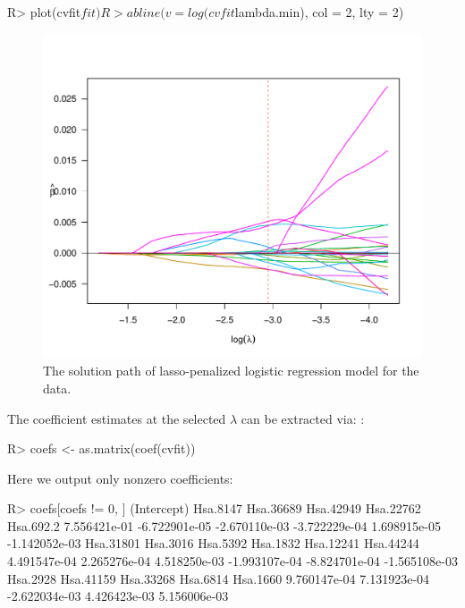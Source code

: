 \begin{example}
R> plot(cvfit$fit)
R> abline(v = log(cvfit$lambda.min), col = 2, lty = 2)
\end{example}

\begin{figure}[ht]
\centering
\includegraphics[scale=0.7]{Figures/JSS_data_example.pdf}
\caption{The solution path of lasso-penalized logistic regression model for the  data.}
\label{data_example}
\end{figure}

The coefficient estimates at the selected $\lambda$ can be extracted via:
:
\begin{example}
R> coefs <- as.matrix(coef(cvfit))
\end{example}
Here we output only nonzero coefficients:
\begin{example}
R> coefs[coefs != 0, ]
  (Intercept)      Hsa.8147     Hsa.36689     Hsa.42949     Hsa.22762     Hsa.692.2 
 7.556421e-01 -6.722901e-05 -2.670110e-03 -3.722229e-04  1.698915e-05 -1.142052e-03 
    Hsa.31801      Hsa.3016      Hsa.5392      Hsa.1832     Hsa.12241     Hsa.44244 
 4.491547e-04  2.265276e-04  4.518250e-03 -1.993107e-04 -8.824701e-04 -1.565108e-03 
     Hsa.2928     Hsa.41159     Hsa.33268      Hsa.6814      Hsa.1660 
 9.760147e-04  7.131923e-04 -2.622034e-03  4.426423e-03  5.156006e-03 
\end{example}

